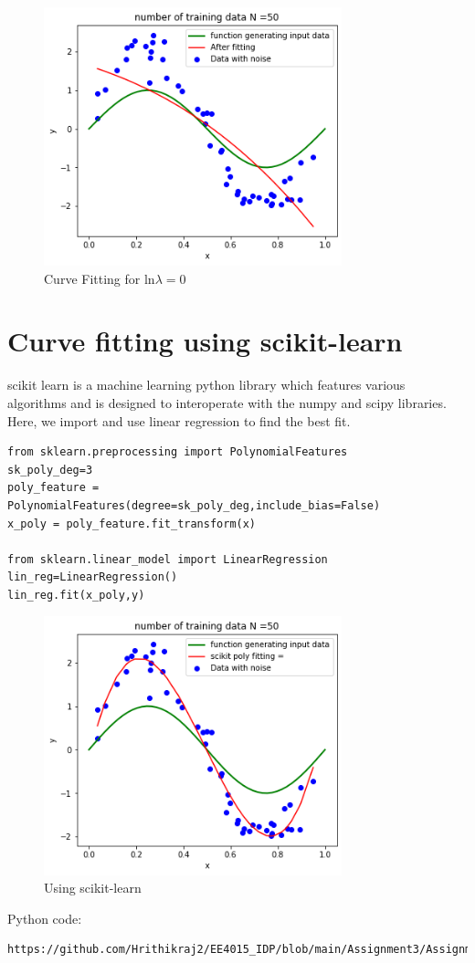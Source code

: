 \documentclass[journal,12pt,twocolumn]{IEEEtran}
\begin{document}
\begin{figure}[!h]
\begin{center}
\includegraphics[width=3.4in]{figs/fig3.png}
\end{center}
\caption{Curve Fitting for ln$\lambda = 0$}
\label{fig:3}
\end{figure}
\section{Curve fitting using scikit-learn}
scikit learn is a machine learning python library which features various algorithms and is designed to interoperate with the numpy and scipy libraries.
Here, we import and use linear regression to find the best fit.
\begin{lstlisting}
from sklearn.preprocessing import PolynomialFeatures
sk_poly_deg=3
poly_feature = PolynomialFeatures(degree=sk_poly_deg,include_bias=False)
x_poly = poly_feature.fit_transform(x)

from sklearn.linear_model import LinearRegression
lin_reg=LinearRegression()
lin_reg.fit(x_poly,y)
\end{lstlisting}
\begin{figure}[!h]
\begin{center}
\includegraphics[width=3.4in]{figs/fig4.png}
\end{center}
\caption{Using scikit-learn}
\label{fig:4}
\end{figure}
Python code:
\begin{lstlisting}
https://github.com/Hrithikraj2/EE4015_IDP/blob/main/Assignment3/Assignment_3_Regularization.ipynb
\end{lstlisting}
\end{document}
